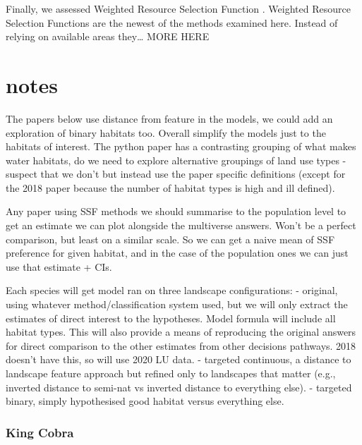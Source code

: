 \documentclass[10pt,a4paper]{article}
\begin{document}
Finally, we assessed Weighted Resource Selection Function .
Weighted Resource Selection Functions are the newest of the methods examined here.
Instead of relying on available areas they\ldots{} MORE HERE

\hypertarget{notes}{%
\section{notes}\label{notes}}

The papers below use distance from feature in the models, we could add an exploration of binary habitats too.
Overall simplify the models just to the habitats of interest.
The python paper has a contrasting grouping of what makes water habitats, do we need to explore alternative groupings of land use types - suspect that we don't but instead use the paper specific definitions (except for the 2018 paper because the number of habitat types is high and ill defined).

Any paper using SSF methods we should summarise to the population level to get an estimate we can plot alongside the multiverse answers.
Won't be a perfect comparison, but least on a similar scale.
So we can get a naive mean of SSF preference for given habitat, and in the case of the population ones we can just use that estimate + CIs.

Each species will get model ran on three landscape configurations:
- original, using whatever method/classification system used, but we will only extract the estimates of direct interest to the hypotheses. Model formula will include all habitat types. This will also provide a means of reproducing the original answers for direct comparison to the other estimates from other decisions pathways. 2018 doesn't have this, so will use 2020 LU data.
- targeted continuous, a distance to landscape feature approach but refined only to landscapes that matter (e.g., inverted distance to semi-nat vs inverted distance to everything else).
- targeted binary, simply hypothesised good habitat versus everything else.

\hypertarget{king-cobra-1}{%
\subsubsection{King Cobra}\label{king-cobra-1}}
\end{document}
